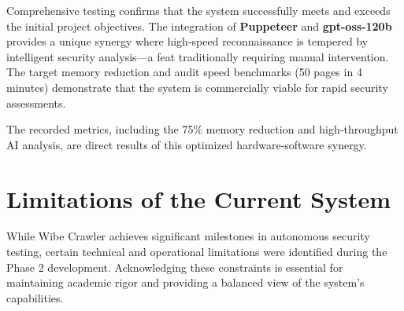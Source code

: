 \documentclass[12pt,oneside,a4paper]{book}
\begin{document}
Comprehensive testing confirms that the system successfully meets and exceeds the initial project objectives. The integration of \textbf{ Puppeteer} and \textbf{gpt-oss-120b} provides a unique synergy where high-speed reconnaissance is tempered by intelligent security analysis—a feat traditionally requiring manual intervention. The target memory reduction and audit speed benchmarks (50 pages in 4 minutes) demonstrate that the system is commercially viable for rapid security assessments.

The recorded metrics, including the 75\% memory reduction and high-throughput AI analysis, are direct results of this optimized hardware-software synergy.



\section{Limitations of the Current System}

While Wibe Crawler achieves significant milestones in autonomous security testing, certain technical and operational limitations were identified during the Phase 2 development. Acknowledging these constraints is essential for maintaining academic rigor and providing a balanced view of the system's capabilities.
\end{document}
